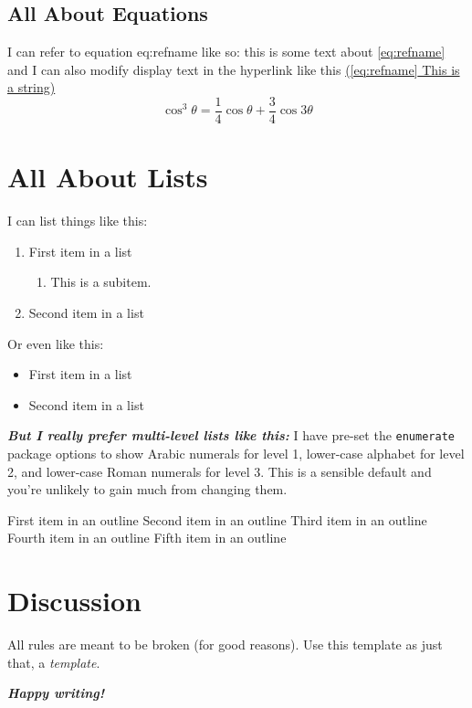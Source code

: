 \documentclass{getwriting}
\begin{document}
\subsection{All About Equations}
I can refer to equation eq:refname like so: this is some text about \hyperref[eq:refname]{\autoref{eq:refname}} and I can also modify display text in the hyperlink like this \hyperref[eq:refname]{(\autoref{eq:refname} This is a string)}
\begin{equation}
	\cos^3 \theta =\frac{1}{4}\cos\theta+\frac{3}{4}\cos 3\theta
	\label{eq:refname}
\end{equation}
\section{All About Lists}
I can list things like this:
\begin{enumerate}
	\item First item in a list
	\begin{enumerate}
	    \item This is a subitem.
	\end{enumerate}
	\item Second item in a list
\end{enumerate}
Or even like this:
\begin{itemize}
	\item{First item in a list}
	\item{Second item in a list}
\end{itemize}
\textit{\textbf{But I really prefer \textbf{multi-level lists} like this:}}
I have pre-set the \lstinline{enumerate} package options to show Arabic numerals for level 1, lower-case alphabet for level 2, and lower-case Roman numerals for level 3. This is a sensible default and you're unlikely to gain much from changing them.
\begin{outline}[enumerate]
	\1 First item in an outline
	\2 Second item in an outline
	\3 Third item in an outline
	\1 Fourth item in an outline
	\2 Fifth item in an outline
\end{outline}
\section{Discussion}
All rules are meant to be broken (for good reasons). Use this template as just that, a \textit{template}. 
\par
\begin{center}
    \Large{\textit{\textbf{Happy writing!}}}
\end{center}
\newpage
\end{document}

